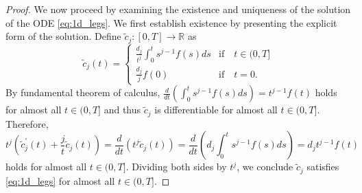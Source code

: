 \documentclass[10pt,a4paper]{amsart}
\newcommand{\derivative}[1]{#1^{\prime}}
\newcommand{\pr}[1]{ \left( #1 \right) }
\begin{document}
\begin{proof}
    We now proceed by examining the existence and uniqueness of the solution 
    of the ODE \eqref{eq:1d_legs}. 
    We first establish existence by presenting the explicit form of the solution.  
    Define $\tilde{c}_j\colon[0,T]\to\mathbb{R}$ as
    \begin{equation}    \label{eq:closed_form_solution}
        \tilde{c}_j(t) = \begin{cases}
            \frac{d_j}{t^j} \int^t_0 s^{j-1} f(s) ds  & \text{if} \quad t \in (0,T] \\
            \frac{d_j}{j} f(0)  & \text{if} \quad t = 0.
        \end{cases}
    \end{equation}
    By fundamental theorem of calculus, $\frac{d}{dt} \pr{ \int^t_0 s^{j-1} f(s) ds } = t^{j-1} f(t)$ holds for almost all $t\in(0,T]$ and thus $\tilde{c}_j$ is differentiable for almost all $t\in(0,T]$. 
    Therefore,
    \[
        t^j \pr{ \derivative{\tilde{c}}_j(t) + \frac{j}{t} \tilde{c}_j(t) } 
        = \frac{d}{dt} (t^j\tilde{c}_j(t)) 
        = \frac{d}{dt} \pr{ d_j \int^t_0 s^{j-1} f(s) ds }
        = d_j t^{j-1} f(t) 
    \]
    holds for almost all $t\in(0,T]$. 
    Dividing both sides by $t^j$, we conclude $\tilde{c}_j$ satisfies \eqref{eq:1d_legs} for almost all $t\in(0,T]$.
    

\end{proof}
\end{document}
